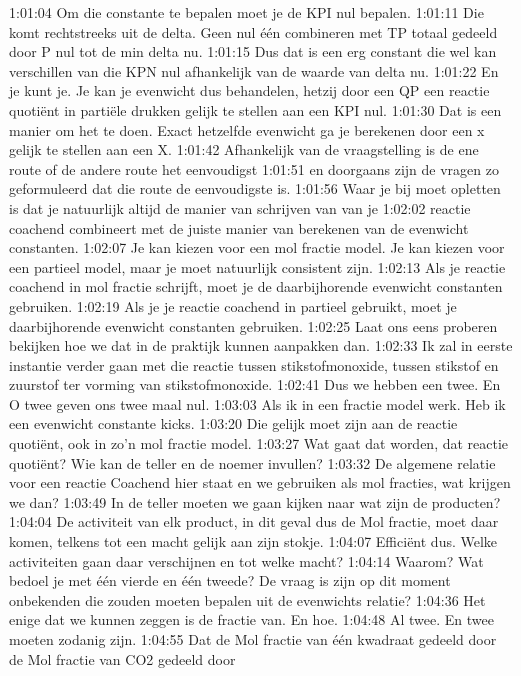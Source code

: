 1:01:04
Om die constante te bepalen moet je de KPI nul bepalen.
1:01:11
Die komt rechtstreeks uit de delta. Geen nul één combineren met TP totaal gedeeld door P nul tot de min delta nu.
1:01:15
Dus dat is een erg constant die wel kan verschillen van die KPN nul afhankelijk van de waarde van delta nu.
1:01:22
En je kunt je. Je kan je evenwicht dus behandelen, hetzij door een QP een reactie quotiënt in partiële drukken gelijk te stellen aan een KPI nul.
1:01:30
Dat is een manier om het te doen. Exact hetzelfde evenwicht ga je berekenen door een x gelijk te stellen aan een X.
1:01:42
Afhankelijk van de vraagstelling is de ene route of de andere route het eenvoudigst
1:01:51
en doorgaans zijn de vragen zo geformuleerd dat die route de eenvoudigste is.
1:01:56
Waar je bij moet opletten is dat je natuurlijk altijd de manier van schrijven van van je
1:02:02
reactie coachend combineert met de juiste manier van berekenen van de evenwicht constanten.
1:02:07
Je kan kiezen voor een mol fractie model. Je kan kiezen voor een partieel model, maar je moet natuurlijk consistent zijn.
1:02:13
Als je reactie coachend in mol fractie schrijft, moet je de daarbijhorende evenwicht constanten gebruiken.
1:02:19
Als je je reactie coachend in partieel gebruikt, moet je daarbijhorende evenwicht constanten gebruiken.
1:02:25
Laat ons eens proberen bekijken hoe we dat in de praktijk kunnen aanpakken dan.
1:02:33
Ik zal in eerste instantie verder gaan met die reactie tussen stikstofmonoxide, tussen stikstof en zuurstof ter vorming van stikstofmonoxide.
1:02:41
Dus we hebben een twee. En O twee geven ons twee maal nul.
1:03:03
Als ik in een fractie model werk. Heb ik een evenwicht constante kicks.
1:03:20
Die gelijk moet zijn aan de reactie quotiënt, ook in zo'n mol fractie model.
1:03:27
Wat gaat dat worden, dat reactie quotiënt? Wie kan de teller en de noemer invullen?
1:03:32
De algemene relatie voor een reactie Coachend hier staat en we gebruiken als mol fracties, wat krijgen we dan?
1:03:49
In de teller moeten we gaan kijken naar wat zijn de producten?
1:04:04
De activiteit van elk product, in dit geval dus de Mol fractie, moet daar komen, telkens tot een macht gelijk aan zijn stokje.
1:04:07
Efficiënt dus. Welke activiteiten gaan daar verschijnen en tot welke macht?
1:04:14
Waarom? Wat bedoel je met één vierde en één tweede? De vraag is zijn op dit moment onbekenden die zouden moeten bepalen uit de evenwichts relatie?
1:04:36
Het enige dat we kunnen zeggen is de fractie van. En hoe.
1:04:48
Al twee. En twee moeten zodanig zijn.
1:04:55
Dat de Mol fractie van één kwadraat gedeeld door de Mol fractie van CO2 gedeeld door
